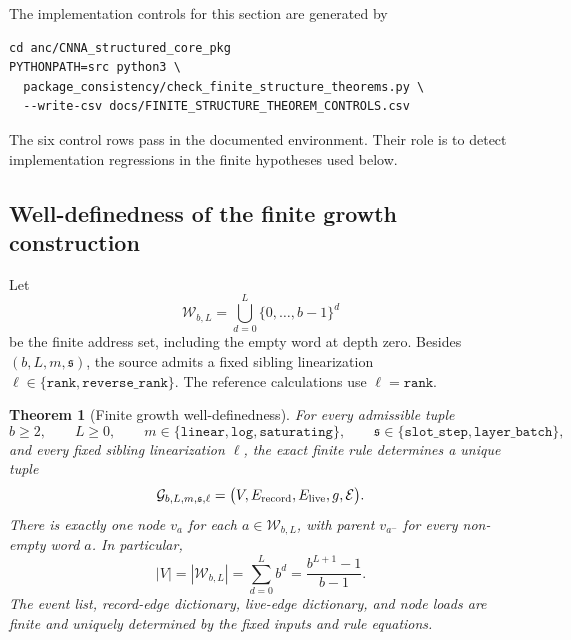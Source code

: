 \documentclass[11pt]{article}
\newtheorem{theorem}[definition]{Theorem}
\theoremstyle{remark}
\newcommand{\code}[1]{\texttt{#1}}
\numberwithin{equation}{section}
\begin{document}
The implementation controls for this section are generated by
\begin{verbatim}
cd anc/CNNA_structured_core_pkg
PYTHONPATH=src python3 \
  package_consistency/check_finite_structure_theorems.py \
  --write-csv docs/FINITE_STRUCTURE_THEOREM_CONTROLS.csv
\end{verbatim}
The six control rows pass in the documented environment. Their role is to detect implementation regressions in the finite hypotheses used below.

\subsection{Well-definedness of the finite growth construction}
Let
\[
  \mathcal W_{b,L}=\bigcup_{d=0}^{L}\{0,\ldots,b-1\}^{d}
\]
be the finite address set, including the empty word at depth zero. Besides \((b,L,m,\mathfrak s)\), the source admits a fixed sibling linearization \(\ell\in\{\code{rank},\code{reverse\_rank}\}\). The reference calculations use \(\ell=\code{rank}\).

\begin{theorem}[Finite growth well-definedness]\label{thm:finite-growth-well-defined}
For every admissible tuple
\[
 b\ge2,\qquad L\ge0,\qquad
 m\in\{\code{linear},\code{log},\code{saturating}\},\qquad
 \mathfrak s\in\{\code{slot\_step},\code{layer\_batch}\},
\]
and every fixed sibling linearization \(\ell\), the exact finite rule determines a unique tuple
\[
  \mathcal G_{b,L,m,\mathfrak s,\ell}
  =\bigl(V,E_{\rm record},E_{\rm live},g,\mathcal E\bigr).
\]
There is exactly one node \(v_a\) for each \(a\in\mathcal W_{b,L}\), with parent \(v_{a^-}\) for every non-empty word \(a\). In particular,
\begin{equation}
  |V|=|\mathcal W_{b,L}|=\sum_{d=0}^{L}b^d=\frac{b^{L+1}-1}{b-1}.
  \label{eq:finite-growth-cardinality-theorem}
\end{equation}
The event list, record-edge dictionary, live-edge dictionary, and node loads are finite and uniquely determined by the fixed inputs and rule equations.
\end{theorem}
\end{document}
